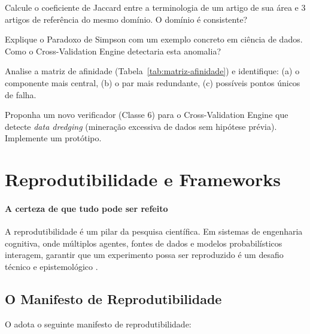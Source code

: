 \begin{exercicio}
Calcule o coeficiente de Jaccard entre a terminologia de um artigo
de sua área e 3 artigos de referência do mesmo domínio. O domínio
é consistente?
\end{exercicio}

\begin{exercicio}
Explique o Paradoxo de Simpson com um exemplo concreto em ciência
de dados. Como o Cross-Validation Engine detectaria esta anomalia?
\end{exercicio}

\begin{exercicio}
Analise a matriz de afinidade (Tabela~\ref{tab:matriz-afinidade})
e identifique: (a) o componente mais central, (b) o par mais
redundante, (c) possíveis pontos únicos de falha.
\end{exercicio}

\begin{exercicio}
Proponha um novo verificador (Classe 6) para o Cross-Validation
Engine que detecte \textit{data dredging} (mineração excessiva de
dados sem hipótese prévia). Implemente um protótipo.
\end{exercicio}

\section{Reprodutibilidade e Frameworks}
\label{sec:reprodutibilidade}
\nivelavancado

\paragraph{A certeza de que tudo pode ser refeito} A reprodutibilidade é um pilar da pesquisa científica. Em sistemas
de engenharia cognitiva, onde múltiplos agentes, fontes de dados
e modelos probabilísticos interagem, garantir que um experimento
possa ser reproduzido é um desafio técnico e epistemológico
\cite{peng2011reproducible, buck2018reproducible}.

\subsection{O Manifesto de Reprodutibilidade}

O \opencodeeco{} adota o seguinte manifesto de reprodutibilidade:

